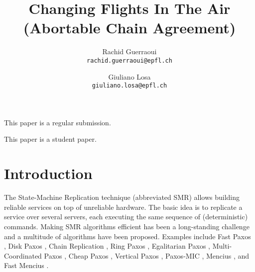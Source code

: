 




\title{Changing Flights In The Air\\ (Abortable Chain Agreement)}

\author{
  Rachid Guerraoui\\
  \texttt{rachid.guerraoui@epfl.ch}
  \and
  Giuliano Losa\\
  \texttt{giuliano.losa@epfl.ch}
}

\date{}



\maketitle



\vspace{2cm}

\begin{center}
This paper is a regular submission.

\vspace{1cm}
This paper is a student paper.
\end{center}

\newpage

\section{Introduction}

The State-Machine Replication technique (abbreviated SMR) allows
building reliable services on top of unreliable hardware. The basic idea is to 
replicate a service over several servers, each executing the same
sequence of (deterministic) commands. 
Making SMR algorithms efficient has been a long-standing
challenge and a multitude of algorithms have been proposed. Examples
include Fast Paxos \cite{Lamport06FastPaxos}, Disk Paxos
\cite{GafniLamport03DiskPaxos}, Chain Replication
\cite{RenesseSchneider04ChainReplicationSupportingHighThroughputAvailability},
Ring Paxos
\cite{MarandiETAL10RingPaxosHighthroughputAtomicBroadcastProtocol},
Egalitarian Paxos
\cite{MoraruAndersenKaminsky13ThereIsMoreConsensusEgalitarianParliaments},
Multi-Coordinated Paxos
\cite{CamargosSchmidtPedone07MulticoordinatedPaxos}, Cheap Paxos
\cite{LamportMassa04CheapPaxos}, Vertical Paxos
\cite{LamportMalkhiZhou09VerticalPaxosPrimarybackupReplication},
Paxos-MIC
\cite{HurfinMoiseNarzul11AdaptiveFastPaxosMakingQuickEverlasting},
Mencius
\cite{MaoJunqueiraMarzullo08MenciusBuildingEfficientReplicatedStateMachine},
and Fast Mencius \cite{WeiETAL13FastMenciusMenciusLowCommitLatency}.

